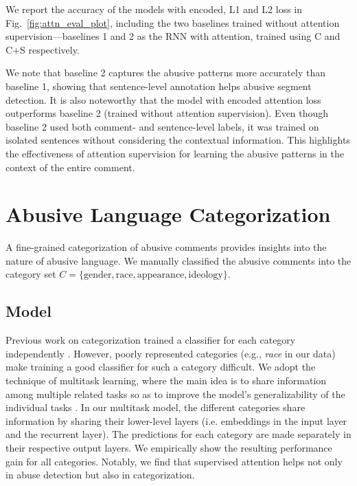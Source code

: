 \documentclass[letterpaper]{article}
\begin{document}
We report the accuracy of the models with encoded, L1 and L2 loss in Fig.~\ref{fig:attn_eval_plot}, including the two baselines trained without attention supervision---baselines 1 and 2 as   the RNN with attention, trained using C and C+S respectively.


We note that  baseline 2 captures the abusive patterns more accurately than baseline 1, showing that sentence-level annotation helps abusive segment detection. It is also noteworthy that the model with encoded attention loss outperforms baseline 2 (trained without attention supervision). Even though baseline 2 used both comment- and sentence-level labels, it was trained on isolated sentences without considering the contextual information. This highlights the effectiveness of attention supervision for learning the abusive patterns  in the context of the entire comment.



\section{Abusive Language Categorization}
\label{sec:categorization}

A fine-grained categorization of abusive comments provides insights into the nature of  abusive language.
We  manually classified the abusive comments into the category set $C=\{\text{gender}, \text{race}, \text{appearance}, \text{ideology}\}$.


\subsection{Model}
Previous work on categorization trained a classifier for each category independently \cite{van2015detection,dinakar2011modeling}.
However, poorly represented categories (e.g., \textit{race} in our data) make  training a good classifier for such a category  difficult. We adopt the technique of multitask learning, where the main idea is to share information among multiple related tasks so as to improve the model's  generalizability  of the individual tasks \cite{standley2020tasks}. In our multitask model, the different categories share information by sharing their lower-level layers (i.e. embeddings in the input layer and the recurrent layer).
The predictions for each category are made separately in their respective output layers. We empirically show the resulting performance gain for all categories. Notably, we find that supervised attention helps not only in abuse detection but also in categorization.
\end{document}
